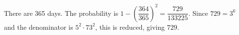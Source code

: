 There are 365 days. The probability is $1-(\dfrac{364}{365})^2=\dfrac{729}{133225}$. Since $729=3^6$ and the denominator is $5^2\cdot73^2$, this is reduced, giving $\boxed{729}$.
